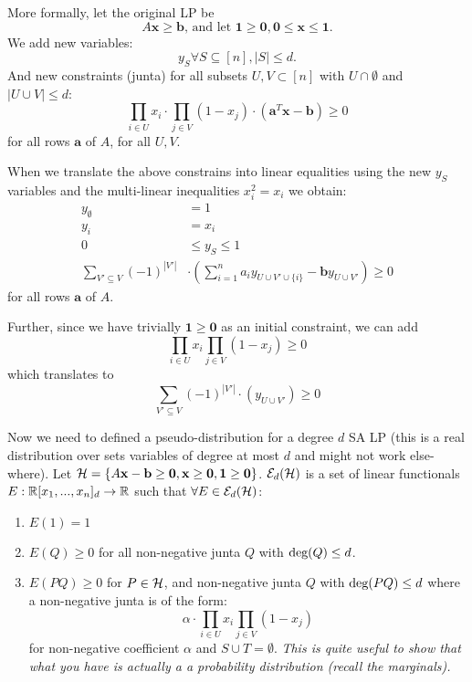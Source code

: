 More formally, let the original LP be 
\[A\mathbf{x} \geq \mathbf{b} \mbox{, and let } \mathbf{1} \geq \mathbf{0}, \mathbf{0} \leq \mathbf{x} \leq \mathbf{1}.\] 
We add new variables:
\[y_S \forall S \subseteq [n], |S| \leq d.\]
And new constraints (junta) for all subsets $U, V \subset [n]$ with $U \cap \emptyset$ and $|U \cup V| \leq d$:
\[\prod_{i \in U}x_i \cdot \prod_{j \in V}(1 - x_j) \cdot (\mathbf{a}^T\mathbf{x} - \mathbf{b}) \geq 0 \]
for all rows $\mathbf{a}$ of $A$, for all $U, V$.

When we translate the above constrains into linear equalities using the new $y_S$ variables and the multi-linear inequalities $x_i^2 = x_i$ we obtain:
\begin{align*}
y_{\emptyset} &= 1\\
y_{i} &= x_i\\
0 &\leq y_{S} \leq 1\\
\sum_{V' \subseteq V} (-1)^{|V'|} &\cdot \left(\sum_{i = 1}^n a_i y_{U \cup V' \cup \{i\}} - \mathbf{b}y_{U \cup V'}\right) \geq 0
\end{align*}
for all rows $\mathbf{a}$ of $A$.

Further, since we have trivially $\mathbf{1} \geq \mathbf{0}$ as an initial constraint, we can add
\[\prod_{i \in U}x_i \prod_{j \in V}(1-x_j) \geq 0\]
which translates to 
\[\sum_{V' \subseteq V}(-1)^{|V'|}\cdot \left(y_{U \cup V'}\right) \geq 0\]

Now we need to defined a pseudo-distribution for a degree $d$ SA LP (this is a real distribution over sets variables of degree at most $d$ and might not work else-where). Let $\mathcal{H} = \{A\mathbf{x} - \mathbf{b} \geq \mathbf{0}, \mathbf{x} \geq \mathbf{0}, \mathbf{1} \geq \mathbf{0}\}$. $\mathcal{E}_{d}(\mathcal{H})$ is a set of linear functionals $E: \mathbb{R}[x_1, ..., x_n]_d \rightarrow \mathbb{R}$ such that $\forall E \in \mathcal{E}_{d}(\mathcal{H})$:
\begin{enumerate}
\item $E(1) = 1$
\item $E(Q) \geq 0$ for all non-negative junta $Q$ with $\mbox{deg}(Q) \leq d$. 
\item $E(PQ) \geq 0$ for $P \in \mathcal{H}$, and non-negative junta $Q$ with $\mbox{deg}(PQ) \leq d$ where a non-negative junta is of the form:
\[\alpha \cdot \prod_{i \in U}x_i \prod_{j \in V}(1-x_j)\]
for non-negative coefficient $\alpha$ and $S \cup T = \emptyset$. \emph{This is quite useful to show that what you have is actually a a probability distribution (recall the marginals).}
\end{enumerate}

